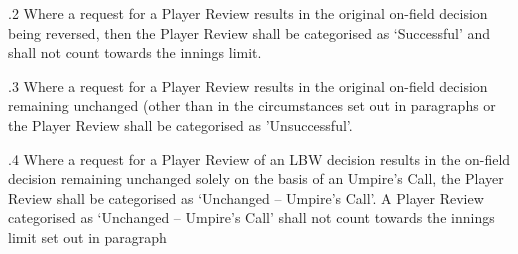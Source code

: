 \documentclass[12pt]{article}
\begin{document}
\vspace{\baselineskip}

\vspace{\baselineskip}
\begin{adjustwidth}{0.0in}{0.08in}
\begin{Center}
{\fontsize{8pt}{9.6pt}\par}
\end{Center}\par

\end{adjustwidth}


\vspace{\baselineskip}

\vspace{\baselineskip}
\begin{adjustwidth}{0.5in}{0.15in}
{\fontsize{9pt}{10.8pt}.2 \tabto{0.49in} Where a request for a Player Review results in the original on-field decision being reversed, then the Player Review shall be categorised as ‘Successful’ and shall not count towards the innings limit.\par}\par

\end{adjustwidth}


\vspace{\baselineskip}
\begin{adjustwidth}{0.5in}{0.32in}
{\fontsize{9pt}{10.8pt}.3 \tabto{0.49in} Where a request for a Player Review results in the original on-field decision remaining unchanged (other than in the circumstances set out in paragraphs or the Player Review shall be categorised as ’Unsuccessful’.\par}\par

\end{adjustwidth}


\vspace{\baselineskip}
\begin{adjustwidth}{0.5in}{0.11in}
{\fontsize{9pt}{10.8pt}.4 \tabto{0.49in} Where a request for a Player Review of an LBW decision results in the on-field decision remaining unchanged solely on the basis of an Umpire’s Call, the Player Review shall be categorised as ‘Unchanged – Umpire’s Call’. A Player Review categorised as ‘Unchanged – Umpire’s Call’ shall not count towards the innings limit set out in paragraph \par}\par

\end{adjustwidth}
\end{document}
